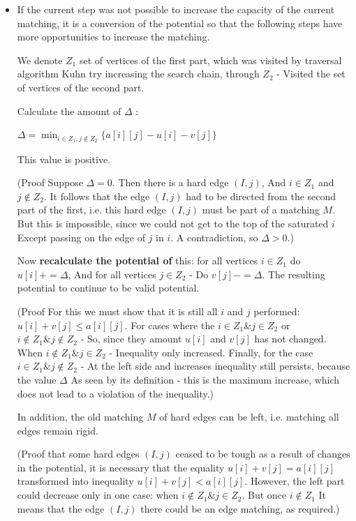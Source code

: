 \begin{itemize}
\item If the current step was not possible to increase the capacity of the current matching, it is a conversion of the potential so that the following steps have more opportunities to increase the matching.

We denote $Z_1$ set of vertices of the first part, which was visited by traversal algorithm Kuhn try increasing the search chain, through $Z_2$ - Visited the set of vertices of the second part.

Calculate the amount of $\Delta$ :

$\Delta=\min_{i\in Z_{1},j\notin Z_{2}}\{a[i][j]-u[i]-v[j]\}$

This value is positive.

(Proof Suppose $\Delta = 0$. Then there is a hard edge $(I, j)$, And $i \in Z_1$ and $j \notin Z_2$. It follows that the edge $(I, j)$ had to be directed from the second part of the first, i.e. this hard edge $(I, j)$ must be part of a matching $M$. But this is impossible, since we could not get to the top of the saturated $i$ Except passing on the edge of $j$ in $i$. A contradiction, so $\Delta> 0$.)

Now \textbf{recalculate the potential of} this: for all vertices $i \in Z_1$ do $u [i] + = \Delta$, And for all vertices $j \in Z_2$ - Do $v [j] - = \Delta$. The resulting potential to continue to be valid potential.

(Proof For this we must show that it is still all $i$ and $j$ performed: $u [i] + v [j] \le a [i][j]$. For cases where the $i \in Z_1 \& j \in Z_2$ or $i \notin Z_1 \& j \notin Z_2$ - So, since they amount $u [i]$ and $v [j]$ has not changed. When $i \notin Z_1 \& j \in Z_2$ - Inequality only increased. Finally, for the case $i \in Z_1 \& j \notin Z_2$ - At the left side and increases inequality still persists, because the value $\Delta$ As seen by its definition - this is the maximum increase, which does not lead to a violation of the inequality.)

In addition, the old matching $M$ of hard edges can be left, i.e. matching all edges remain rigid.

(Proof that some hard edges $(I, j)$ ceased to be tough as a result of changes in the potential, it is necessary that the equality $u [i] + v [j] = a [i][j]$ transformed into inequality $u [i] + v [j] <a [i][j]$. However, the left part could decrease only in one case: when $i \notin Z_1 \& j \in Z_2$. But once $i \notin Z_1$ It means that the edge $(I, j)$ there could be an edge matching, as required.)


\end{itemize}
